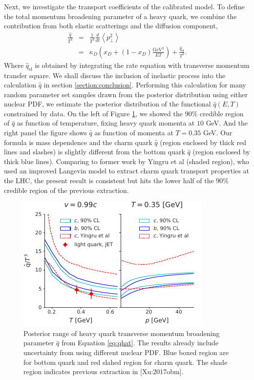 \documentclass[aps, prc, reprint, amsmath, groupedaddress, nofootinbib]{revtex4-1}
\begin{document}
Next, we investigate the transport coefficients of the calibrated model.
To define the total momentum broadening parameter of a heavy quark,
we combine the contribution from both elastic scatterings and the diffusion component,
\begin{eqnarray}\label{eq:qhat}
\frac{\hat{q}}{T^3} &=& \frac{1}{T^3}\frac{d}{dt}\left\langle p_\perp^2 \right\rangle\\
\nonumber
 &=&  \kappa_D\left(x_D + (1-x_D)\frac{\textrm{GeV}^2}{ET}\right) + \frac{\hat{q}_{\textrm{el}}}{T^3}.
\end{eqnarray}
Where $\hat{q}_{\textrm{el}}$ is obtained by integrating the rate equation with transverse momentum transfer square.
We shall discuss the inclusion of inelastic process into the calculation $\hat{q}$ in section \ref{section:conclusion}.
Performing this calculation for many random parameter set samples drawn from the posterior distribution using either nuclear PDF, we estimate the posterior distribution of the functional $\hat{q}(E, T)$ constrained by data.
On the left of Figure \ref{plots:posterior_qhat}, we showed the 90\% credible region of $\hat{q}$ as function of temperature, fixing heavy quark momenta at $10$ GeV.
And the right panel the figure shows $\hat{q}$ as function of momenta at $T=0.35$ GeV.
Our formula is mass dependence and the charm quark $\hat{q}$ (region enclosed by thick red lines and slashes) is slightly different from the bottom quark $\hat{q}$ (region enclosed by thick blue lines).
Comparing to former work by Yingru et al (shaded region), who used an improved Langevin model to extract charm quark transport properties at the LHC, the present result is consistent but hits the lower half of the 90\% credible region of the previous extraction.
\begin{figure}
\includegraphics[width=\columnwidth]{qhat_p_T.pdf}
\caption{Posterior range of heavy quark transverse momentum broadening parameter $\hat{q}$ from Equation \ref{eq:qhat}. The results already include uncertainty from using different nuclear PDF. Blue boxed region are for bottom quark and red slahed region for charm quark. The shade region indicates previous extraction in [Xu:2017obm].}\label{plots:posterior_qhat}
\end{figure}
\end{document}
